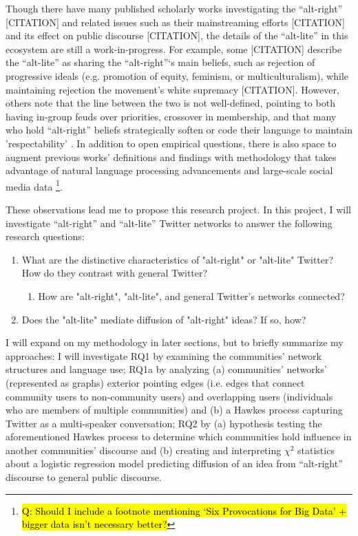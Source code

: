\documentclass[acmlarge, screen, authorversion]{acmart}
\begin{document}
Though there have many published scholarly works investigating the
“alt-right” [CITATION] and related issues such as their mainstreaming
efforts [CITATION] and its effect on public discourse [CITATION], the
details of the “alt-lite” in this ecosystem are still a
work-in-progress. For example, some [CITATION] describe the ``alt-lite” as
sharing the ``alt-right''‘s main beliefs, such as rejection of progressive
ideals (e.g. promotion of equity, feminism, or multiculturalism), while maintaining
rejection the movement’s white supremacy [CITATION]. However, others
note that the line between the two is not well-defined, pointing to both
having in-group feuds over priorities, crossover in membership, and that
many who  hold “alt-right” beliefs strategically soften or code their language to maintain 'respectability' \cite{anti-defamationleagueAltRightAlt, sternProudBoysWhite2019}. In addition
to open empirical questions, there is also space to augment previous
works’ definitions and findings with methodology that takes advantage of
natural language processing advancements and large-scale social media
data \footnote{\hl{Q: Should I include a footnote mentioning `Six Provocations for Big
Data' + bigger data isn't necessary better?}}.

These observations lead me to propose this research project. In this
project, I will investigate “alt-right” and “alt-lite” Twitter networks
to answer the following research questions:

\begin{enumerate}
    \item What are the distinctive characteristics of "alt-right" or "alt-lite" Twitter? How do they contrast with general Twitter?
    \begin{enumerate}
        \item How are "alt-right", "alt-lite", and general Twitter's networks connected?
    \end{enumerate}
    \item Does the "alt-lite" mediate diffusion of "alt-right" ideas? If so, how?
\end{enumerate}

I will expand on my methodology in later sections, but to briefly
summarize my approaches: I will investigate RQ1 by examining the
communities’ network structures and language use; RQ1a by analyzing (a)
communities’ networks’ (represented as graphs) exterior pointing edges
(i.e. edges that connect community users to non-community users) and
overlapping users (individuals who are members of multiple communities)
and (b) a Hawkes process capturing Twitter as a multi-speaker
conversation; RQ2 by (a) hypothesis testing the aforementioned Hawkes
process to determine which communities hold influence in another
communities’ discourse and (b) creating and interpreting $\chi^2$ statistics
about a logistic regression model predicting diffusion of an idea from
“alt-right” discourse to general public discourse.
\end{document}
